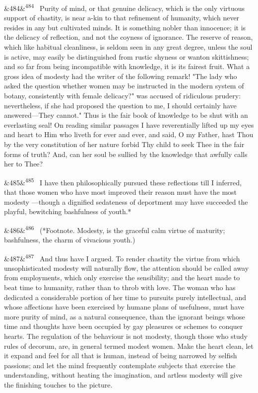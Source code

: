 \documentclass[12pt]{article}
\newcommand{\para}[1][]{\par\noindent\ifx&#1&\else\textsuperscript{\footnotesize #1}~\fi}
\begin{document}
\para[484] Purity of mind, or that genuine delicacy, which is the only virtuous support of chastity, is near a-kin to that refinement of humanity, which never resides in any but cultivated minds. It is something nobler than innocence; it is the delicacy of reflection, and not the coyness of ignorance. The reserve of reason, which like habitual cleanliness, is seldom seen in any great degree, unless the soul is active, may easily be distinguished from rustic shyness or wanton skittishness; and so far from being incompatible with knowledge, it is its fairest fruit. What a gross idea of modesty had the writer of the following remark! "The lady who asked the question whether women may be instructed in the modern system of botany, consistently with female delicacy?" was accused of ridiculous prudery: nevertheless, if she had proposed the question to me, I should certainly have answered---They cannot." Thus is the fair book of knowledge to be shut with an everlasting seal! On reading similar passages I have reverentially lifted up my eyes and heart to Him who liveth for ever and ever, and said, O my Father, hast Thou by the very constitution of her nature forbid Thy child to seek Thee in the fair forms of truth? And, can her soul be sullied by the knowledge that awfully calls her to Thee?

\para[485] I have then philosophically pursued these reflections till I inferred, that those women who have most improved their reason must have the most modesty ---though a dignified sedateness of deportment may have succeeded the playful, bewitching bashfulness of youth.*

\para[486] (*Footnote. Modesty, is the graceful calm virtue of maturity; bashfulness, the charm of vivacious youth.)

\para[487] And thus have I argued. To render chastity the virtue from which unsophisticated modesty will naturally flow, the attention should be called away from employments, which only exercise the sensibility; and the heart made to beat time to humanity, rather than to throb with love. The woman who has dedicated a considerable portion of her time to pursuits purely intellectual, and whose affections have been exercised by humane plans of usefulness, must have more purity of mind, as a natural consequence, than the ignorant beings whose time and thoughts have been occupied by gay pleasures or schemes to conquer hearts. The regulation of the behaviour is not modesty, though those who study rules of decorum, are, in general termed modest women. Make the heart clean, let it expand and feel for all that is human, instead of being narrowed by selfish passions; and let the mind frequently contemplate subjects that exercise the understanding, without heating the imagination, and artless modesty will give the finishing touches to the picture.
\end{document}
